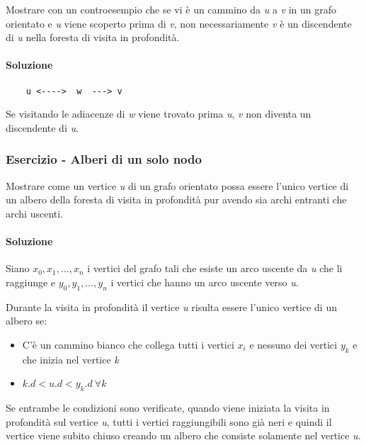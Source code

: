 Mostrare con un controesempio che se vi è un cammino da \textit{u} a \textit{v} in un grafo orientato e \textit{u} viene scoperto prima di \textit{v}, non necessariamente \textit{v} è un discendente di \textit{u} nella foresta di visita in profondità.

\paragraph{Soluzione}


\begin{verbatim}
    u <---->  w  ---> v
\end{verbatim}

Se visitando le adiacenze di \textit{w} viene trovato prima \textit{u}, \textit{v} non diventa un discendente di \textit{u}.

\subsubsection{Esercizio - Alberi di un solo nodo}

Mostrare come un vertice \textit{u} di un grafo orientato possa essere l'unico vertice di un albero della foresta di visita in profondità pur avendo sia archi entranti che archi uscenti.

\paragraph{Soluzione} Siano $ x_0, x_1, \ldots, x_n $ i vertici del grafo tali che esiste un arco uscente da \textit{u} che li raggiunge e $ y_0, y_1, \ldots, y_n $ i vertici che hanno un arco uscente verso \textit{u}.

Durante la visita in profondità il vertice \textit{u} risulta essere l'unico vertice di un albero se:

\begin{itemize}
	\item C'è un cammino bianco che collega tutti i vertici $ x_i $ e nessuno dei vertici $ y_k $ e che inizia nel vertice \textit{k}
	\item $ k.d < u.d < y_k.d \: \forall k$
\end{itemize}

Se entrambe le condizioni sono verificate, quando viene iniziata la visita in profondità sul vertice \textit{u}, tutti i vertici raggiungibili sono già neri e quindi il vertice viene subito chiuso creando un albero che consiste solamente nel vertice \textit{u}.
